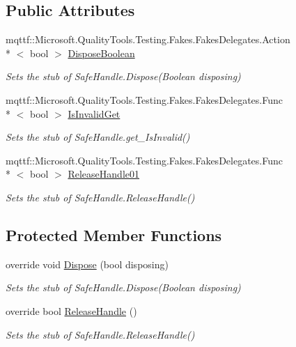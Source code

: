 \subsection*{Public Attributes}
\begin{DoxyCompactItemize}
\item 
mqttf\-::\-Microsoft.\-Quality\-Tools.\-Testing.\-Fakes.\-Fakes\-Delegates.\-Action\\*
$<$ bool $>$ \hyperlink{class_system_1_1_runtime_1_1_interop_services_1_1_fakes_1_1_stub_safe_handle_abf0d51b023f7e9087c749947b88140a2}{Dispose\-Boolean}
\begin{DoxyCompactList}\small\item\em Sets the stub of Safe\-Handle.\-Dispose(\-Boolean disposing)\end{DoxyCompactList}\item 
mqttf\-::\-Microsoft.\-Quality\-Tools.\-Testing.\-Fakes.\-Fakes\-Delegates.\-Func\\*
$<$ bool $>$ \hyperlink{class_system_1_1_runtime_1_1_interop_services_1_1_fakes_1_1_stub_safe_handle_a51329878c7b35ca3da67ba98868df47f}{Is\-Invalid\-Get}
\begin{DoxyCompactList}\small\item\em Sets the stub of Safe\-Handle.\-get\-\_\-\-Is\-Invalid()\end{DoxyCompactList}\item 
mqttf\-::\-Microsoft.\-Quality\-Tools.\-Testing.\-Fakes.\-Fakes\-Delegates.\-Func\\*
$<$ bool $>$ \hyperlink{class_system_1_1_runtime_1_1_interop_services_1_1_fakes_1_1_stub_safe_handle_ae4eaf06523cba7b56849f8bf51a681ec}{Release\-Handle01}
\begin{DoxyCompactList}\small\item\em Sets the stub of Safe\-Handle.\-Release\-Handle()\end{DoxyCompactList}\end{DoxyCompactItemize}
\subsection*{Protected Member Functions}
\begin{DoxyCompactItemize}
\item 
override void \hyperlink{class_system_1_1_runtime_1_1_interop_services_1_1_fakes_1_1_stub_safe_handle_ab8700012611b8e87c74cb909e1752b1a}{Dispose} (bool disposing)
\begin{DoxyCompactList}\small\item\em Sets the stub of Safe\-Handle.\-Dispose(\-Boolean disposing)\end{DoxyCompactList}\item 
override bool \hyperlink{class_system_1_1_runtime_1_1_interop_services_1_1_fakes_1_1_stub_safe_handle_a0911e56ba401239e549e5f91b32de7bf}{Release\-Handle} ()
\begin{DoxyCompactList}\small\item\em Sets the stub of Safe\-Handle.\-Release\-Handle()\end{DoxyCompactList}\end{DoxyCompactItemize}
